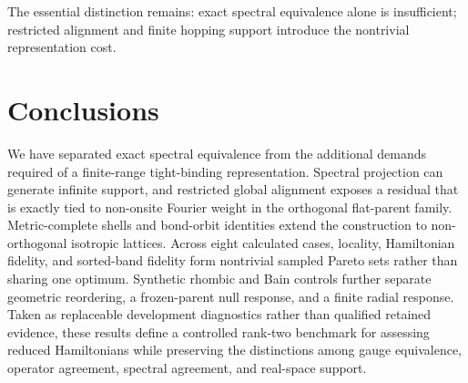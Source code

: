 \documentclass[11pt]{article}
\begin{document}
The essential distinction remains: exact spectral equivalence alone is insufficient;
restricted alignment and finite hopping support introduce the nontrivial representation
cost.

\section{Conclusions}

We have separated exact spectral equivalence from the additional demands required of a
finite-range tight-binding representation. Spectral projection can generate infinite
support, and restricted global alignment exposes a residual that is exactly tied to
non-onsite Fourier weight in the orthogonal flat-parent family. Metric-complete shells
and bond-orbit identities extend the construction to non-orthogonal isotropic lattices.
Across eight calculated cases, locality, Hamiltonian fidelity, and sorted-band fidelity
form nontrivial sampled Pareto sets rather than sharing one optimum. Synthetic rhombic
and Bain controls further separate geometric reordering, a frozen-parent null response,
and a finite radial response. Taken as replaceable development diagnostics rather than
qualified retained evidence, these results define a controlled rank-two benchmark for
assessing reduced Hamiltonians while preserving the distinctions among gauge
equivalence, operator agreement, spectral agreement, and real-space support.

\clearpage
\appendix




\end{document}
